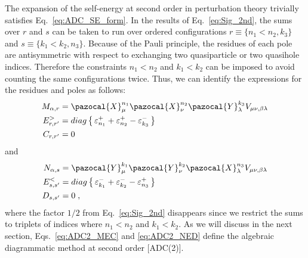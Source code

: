 The expansion of the self-energy at second order in perturbation theory trivially satisfies Eq.~\eqref{eq:ADC_SE_form}. In the results  of Eq.~\eqref{eq:Sig_2nd}, the sums over $r$ and $s$ can be taken to run over ordered configurations $r\equiv\{n_1 < n_2,k_3\}$ and  $s\equiv\{k_1 < k_2, n_3\}$. Because of the Pauli principle, the residues of each pole are antisymmetric with respect to exchanging two quasiparticle or two quasihole indices. Therefore the constraints  $n_1 < n_2$ and  $k_1 < k_2$  can be imposed to avoid counting the same configurations twice. Thus, we can identify the expressions for the residues and poles as follows:
\begin{subequations}
 \label{eq:ADC2_MEC}
\begin{align}
 M_{\alpha,r} ={}& %
     \pazocal{X}^{n_1}_\mu \pazocal{X}^{n_2}_\nu  \pazocal{Y}^{k_3}_\lambda  V_{\mu \nu, \beta \lambda}
  \label{eq:ADC2_M}  \\
 E^>_{r,r'} ={}& diag \left\{ \,\varepsilon^+_{n_1} + \varepsilon^+_{n_2} - \varepsilon^-_{k_3}  \, \right\}
 \label{eq:ADC2_Efw}  \\
 C_{r,r'} ={}& 0
 \label{eq:ADC2_C}
 \end{align}
\end{subequations}
and 
\begin{subequations}
\label{eq:ADC2_NED}
\begin{align}
 N_{\alpha,s}  ={}& \pazocal{Y}^{k_1}_\mu \pazocal{Y}^{k_2}_\nu \pazocal{X}^{n_3}_\lambda  V_{\mu \nu, \beta \lambda}
   \label{eq:ADC2_N}  \\
 E^<_{s,s'}  ={}& diag \left\{ \, \varepsilon^-_{k_1} + \varepsilon^-_{k_2} - \varepsilon^+_{n_3} \, \right\} 
   \label{eq:ADC2_Ebk}  \\
 D_{s,s'}  ={}& 0  \; ,
  \label{eq:ADC2_D}
\end{align}
\end{subequations}
where the factor $1/2$ from Eq.~\eqref{eq:Sig_2nd} disappears since we restrict the sums to triplets of indices where  $n_1<n_2$ and $k_1<k_2$.
As we will discuss in the next section, Eqs.~\eqref{eq:ADC2_MEC} and \eqref{eq:ADC2_NED} define the algebraic diagrammatic method at second order [ADC(2)].


